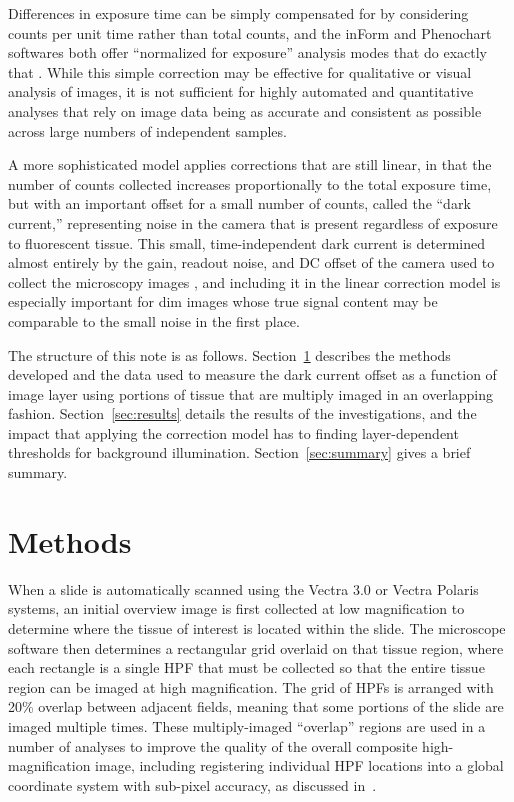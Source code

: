 \documentclass[letterpaper,11pt]{article}
\newcommand{\refsec}[1]{Section~\ref{#1}}
\begin{document}
Differences in exposure time can be simply compensated for by considering counts per unit time rather than total counts, and the inForm and Phenochart softwares both offer ``normalized for exposure'' analysis modes that do exactly that \cite{inform_user_manual,phenochart_user_manual}. While this simple correction may be effective for qualitative or visual analysis of images, it is not sufficient for highly automated and quantitative analyses that rely on image data being as accurate and consistent as possible across large numbers of independent samples. 

A more sophisticated model applies corrections that are still linear, in that the number of counts collected increases proportionally to the total exposure time, but with an important offset for a small number of counts, called the ``dark current,'' representing noise in the camera that is present regardless of exposure to fluorescent tissue. This small, time-independent dark current is determined almost entirely by the gain, readout noise, and DC offset of the camera used to collect the microscopy images \cite{doi:10.1111/j.1365-2818.2011.03581.x}, and including it in the linear correction model is especially important for dim images whose true signal content may be comparable to the small noise in the first place.

The structure of this note is as follows. \refsec{sec:methods} describes the methods developed and the data used to measure the dark current offset as a function of image layer using portions of tissue that are multiply imaged in an overlapping fashion. \refsec{sec:results} details the results of the investigations, and the impact that applying the correction model has to finding layer-dependent thresholds for background illumination. \refsec{sec:summary} gives a brief summary.

\section{Methods}
\label{sec:methods}

When a slide is automatically scanned using the Vectra 3.0 or Vectra Polaris systems, an initial overview image is first collected at low magnification to determine where the tissue of interest is located within the slide. The microscope software then determines a rectangular grid overlaid on that tissue region, where each rectangle is a single HPF that must be collected so that the entire tissue region can be imaged at high magnification. The grid of HPFs is arranged with 20\% overlap between adjacent fields, meaning that some portions of the slide are imaged multiple times. These multiply-imaged ``overlap'' regions are used in a number of analyses to improve the quality of the overall composite high-magnification image, including registering individual HPF locations into a global coordinate system with sub-pixel accuracy, as discussed in~\cite{Heshy}.
\end{document}
